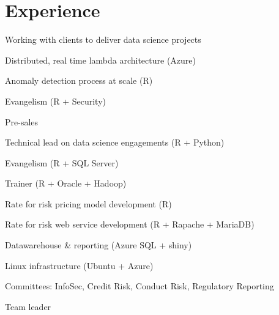 \documentclass[]{single-page-resume}
\begin{document}
\begin{minipage}[t]{0.66\textwidth} 


\section{Experience}
\vspace{\topsep} %
\begin{tightemize}
    \item Working with clients to deliver data science projects
\end{tightemize}
\begin{tightemize}
    \item Distributed, real time lambda architecture (Azure)
    \item Anomaly detection process at scale (R)
    \item Evangelism (R + Security)
\end{tightemize}
\sectionsep 
{}
\begin{tightemize}
    \item Pre-sales
    \item Technical lead on data science engagements (R + Python)
    \item Evangelism (R + SQL Server)
    \item Trainer (R + Oracle + Hadoop)
\end{tightemize}
\sectionsep 

\begin{tightemize}
    \item Rate for risk pricing model development (R)
    \item Rate for risk web service development (R + Rapache + MariaDB)
    \item Datawarehouse \& reporting (Azure SQL + shiny)
    \item Linux infrastructure (Ubuntu + Azure)
    \item Committees: InfoSec, Credit Risk, Conduct Risk, Regulatory Reporting
    \item Team leader
\end{tightemize}
\sectionsep


\end{minipage}
\end{document}
